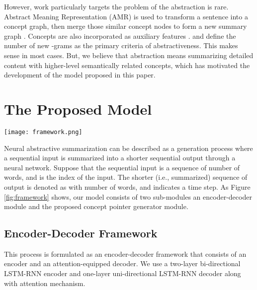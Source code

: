 \documentclass[11pt,a4paper]{article}
\begin{document}
However, work particularly targets the problem of the abstraction is rare. Abstract Meaning Representation (AMR) is used to transform a sentence into a concept graph, then merge those similar concept nodes to form a new summary graph \cite{liu2018toward}. Concepts are also incorporated as auxiliary features \cite{guo2017conceptual}.  \citet{DBLP:conf/emnlp/KryscinskiPXS18} and \citet{weber2018controlling} define the number of new -grams  as the primary criteria of abstractiveness. This makes sense in most cases. But, we believe that abstraction means summarizing detailed content with higher-level semantically related concepts, which has motivated the development of the model proposed in this paper.


\section{The Proposed Model}

\begin{figure*}[t]
\texttt{[image: framework.png]}
\caption{The architecture of our model. Blue bar represents the attention distribution over the inputs. Purple bar represents the concept distribution over the inputs. Noted that, this distribution can be sparse since not every word has its upper concept. Green bar represents the vocabulary distribution generated from seq2seq component.}  
	\label{fig:framework}
\end{figure*}

Neural abstractive summarization can be described as a  generation process where a sequential input is summarized into a shorter sequential output through a neural network.  Suppose that the sequential  input   is a sequence of   number of words, and  is the index of the input.  The shorter (i.e., summarized)  sequence of output  is denoted as   with number of  words, and  indicates a time step.  
As Figure \ref{fig:framework} shows, our model consists of two sub-modules \textemdash an encoder-decoder module and the proposed concept pointer generator module.  

\subsection{Encoder-Decoder Framework}
This process is formulated as an encoder-decoder framework that  
consists of an encoder and an attention-equipped decoder. 
We use a two-layer bi-directional LSTM-RNN encoder and  one-layer uni-directional LSTM-RNN decoder  along  with attention mechanism.  
\end{document}
